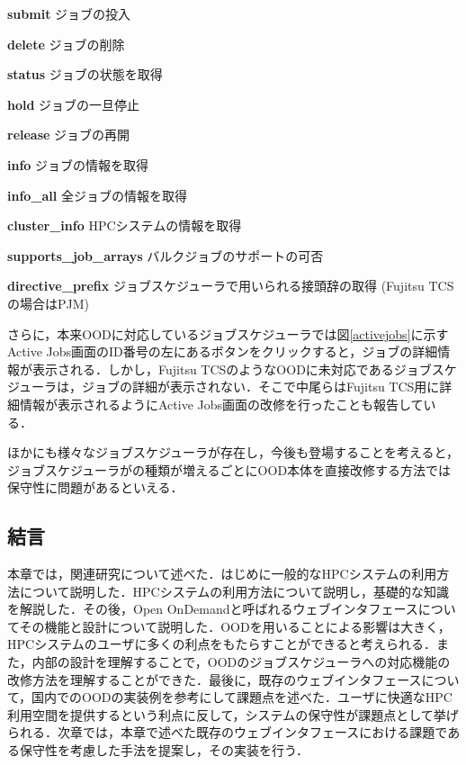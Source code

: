\textbf{submit} ジョブの投入\par
\textbf{delete} ジョブの削除\par
\textbf{status} ジョブの状態を取得\par
\textbf{hold} ジョブの一旦停止\par
\textbf{release} ジョブの再開\par
\textbf{info} ジョブの情報を取得\par
\textbf{info\_all} 全ジョブの情報を取得\par
\textbf{cluster\_info} HPCシステムの情報を取得\par
\textbf{supports\_job\_arrays} バルクジョブのサポートの可否\par
\textbf{directive\_prefix} ジョブスケジューラで用いられる接頭辞の取得 (Fujitsu TCSの場合はPJM)\par

さらに，本来OODに対応しているジョブスケジューラでは図\ref{activejobs}に示すActive Jobs画面のID番号の左にあるボタンをクリックすると，ジョブの詳細情報が表示される．しかし，Fujitsu TCSのようなOODに未対応であるジョブスケジューラは，ジョブの詳細が表示されない．そこで中尾らはFujitsu TCS用に詳細情報が表示されるようにActive Jobs画面の改修を行ったことも報告している\cite{cite4}．\par
ほかにも様々なジョブスケジューラが存在し，今後も登場することを考えると，ジョブスケジューラがの種類が増えるごとにOOD本体を直接改修する方法では保守性に問題があるといえる．\par


\subsection{結言}
本章では，関連研究について述べた．はじめに一般的なHPCシステムの利用方法について説明した．HPCシステムの利用方法について説明し，基礎的な知識を解説した．その後，Open OnDemandと呼ばれるウェブインタフェースについてその機能と設計について説明した．OODを用いることによる影響は大きく，HPCシステムのユーザに多くの利点をもたらすことができると考えられる．また，内部の設計を理解することで，OODのジョブスケジューラへの対応機能の改修方法を理解することができた．最後に，既存のウェブインタフェースについて，国内でのOODの実装例を参考にして課題点を述べた．ユーザに快適なHPC利用空間を提供するという利点に反して，システムの保守性が課題点として挙げられる．次章では，本章で述べた既存のウェブインタフェースにおける課題である保守性を考慮した手法を提案し，その実装を行う．\par